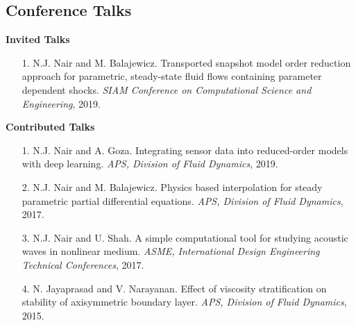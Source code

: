\documentclass[margin]{res}
\begin{document}
\begin{resume}
\section{\large Conference Talks}

\textbf{Invited Talks}

\begin{itemize} 
 \item[1.] N.J. Nair and M. Balajewicz. Transported snapshot model order reduction approach for parametric, steady-state fluid flows containing parameter dependent shocks. \textit{SIAM Conference on Computational Science and Engineering}, 2019.
\end{itemize}

\textbf{Contributed Talks} 
\begin{itemize}
 \item[1.] N.J. Nair and A. Goza. Integrating sensor data into reduced-order models with deep learning. \textit{APS, Division of Fluid Dynamics}, 2019.

 \item[2.] N.J. Nair and M. Balajewicz. Physics based interpolation for steady parametric partial differential equations. \textit{APS, Division of Fluid Dynamics}, 2017.
 
 \item[3.] N.J. Nair and U. Shah. A simple computational tool for studying acoustic waves in nonlinear medium. \textit{ASME, International Design Engineering Technical Conferences}, 2017.
 
 \item[4.] N. Jayaprasad and V. Narayanan. Effect of viscosity stratification on stability of axisymmetric boundary layer. \textit{APS, Division of Fluid Dynamics}, 2015.
  
\end{itemize}
		 

\end{resume}
\end{document}
